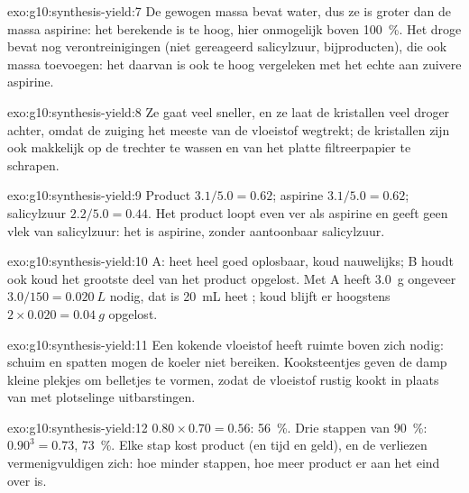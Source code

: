 \begin{solution}{exo:g10:synthesis-yield:7}
De gewogen massa bevat water, dus ze is groter dan de massa aspirine:
het berekende  is te hoog, hier onmogelijk boven
\qty{100}{\percent}. Het droge  bevat nog verontreinigingen
(niet gereageerd salicylzuur, bijproducten), die ook massa toevoegen: het
 daarvan is ook te hoog vergeleken met het echte  aan
zuivere aspirine.
\end{solution}

\begin{solution}{exo:g10:synthesis-yield:8}
Ze gaat veel sneller, en ze laat de kristallen veel droger achter, omdat
de zuiging het meeste van de vloeistof wegtrekt; de kristallen zijn ook
makkelijk op de trechter te wassen en van het platte filtreerpapier te
schrapen.
\end{solution}

\begin{solution}{exo:g10:synthesis-yield:9}
Product $3.1/5.0 = 0.62$; aspirine $3.1/5.0 = 0.62$; salicylzuur
$2.2/5.0 = 0.44$. Het product loopt even ver als aspirine en geeft geen
vlek van salicylzuur: het is aspirine, zonder aantoonbaar salicylzuur.
\end{solution}

\begin{solution}{exo:g10:synthesis-yield:10}
 A: heet heel goed oplosbaar, koud nauwelijks;  B
houdt ook koud het grootste deel van het product opgelost. Met A heeft
\qty{3.0}{g} ongeveer $3.0 / 150 = \qty{0.020}{L}$ nodig, dat is
\qty{20}{mL} heet ; koud blijft er hoogstens
$2 \times 0.020 = \qty{0.04}{g}$ opgelost.
\end{solution}

\begin{solution}{exo:g10:synthesis-yield:11}
Een kokende vloeistof heeft ruimte boven zich nodig: schuim en spatten
mogen de koeler niet bereiken. Kooksteentjes geven de damp kleine
plekjes om belletjes te vormen, zodat de vloeistof rustig kookt in
plaats van met plotselinge uitbarstingen.
\end{solution}

\begin{solution}{exo:g10:synthesis-yield:12}
$0.80 \times 0.70 = 0.56$: \qty{56}{\percent}. Drie stappen van
\qty{90}{\percent}: $0.90^3 = 0.73$, \qty{73}{\percent}. Elke stap kost
product (en tijd en geld), en de verliezen vermenigvuldigen zich: hoe
minder stappen, hoe meer product er aan het eind over is.
\end{solution}

